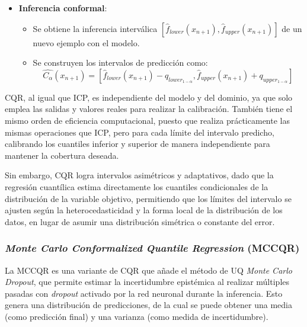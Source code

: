 \begin{itemize}
    \item \textbf{Inferencia conformal}:
    
    \begin{itemize}

        \item Se obtiene la inferencia interválica $[\hat{f}_{lower}(x_{n+1}), \hat{f}_{upper}(x_{n+1})]$ de 
        un nuevo ejemplo con el modelo.
    
        \item Se construyen los intervalos de predicción como:
        $$
        \hat{C_\alpha}(x_{n+1}) = 
            \left[ 
                \hat{f}_{lower}(x_{n+1}) - q_{lower_{1-\alpha}}, 
                \hat{f}_{upper}(x_{n+1}) + q_{upper_{1-\alpha}}
            \right]
        $$

    \end{itemize}

\end{itemize}

CQR, al igual que ICP, es independiente del modelo y del dominio, ya que solo emplea las salidas y 
valores reales para realizar la calibración. También tiene el mismo orden de eficiencia computacional, puesto 
que realiza prácticamente las mismas operaciones que ICP, pero para cada límite del intervalo predicho, 
calibrando los cuantiles inferior y superior de manera independiente para mantener la cobertura deseada.

Sin embargo, CQR logra intervalos asimétricos y adaptativos, dado que la regresión cuantílica
estima directamente los cuantiles condicionales de la distribución de la variable objetivo,
permitiendo que los límites del intervalo se ajusten según la heterocedasticidad y la forma local de la 
distribución de los datos, en lugar de asumir una distribución simétrica o constante del error. 


\subsubsection{\textit{Monte Carlo Conformalized Quantile Regression} (MCCQR)}


La MCCQR \cite{bethell2024} es una variante de CQR que añade el método de UQ \textit{Monte Carlo Dropout}, 
que permite estimar la incertidumbre epistémica al realizar múltiples pasadas con \textit{dropout} activado 
por la red neuronal durante la inferencia. Esto genera una distribución de predicciones, de la cual se puede 
obtener una media (como predicción final) y una varianza (como medida de incertidumbre).



